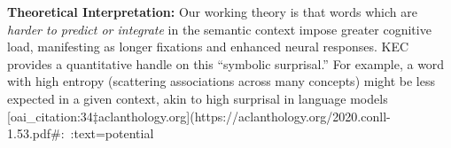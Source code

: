 \textbf{Theoretical Interpretation:} Our working theory is that words which are \textit{harder to predict or integrate} in the semantic context impose greater cognitive load, manifesting as longer fixations and enhanced neural responses. KEC provides a quantitative handle on this “symbolic surprisal.” For example, a word with high entropy (scattering associations across many concepts) might be less expected in a given context, akin to high surprisal in language models [oai_citation:34‡aclanthology.org](https://aclanthology.org/2020.conll-1.53.pdf#:~:text=potential%
